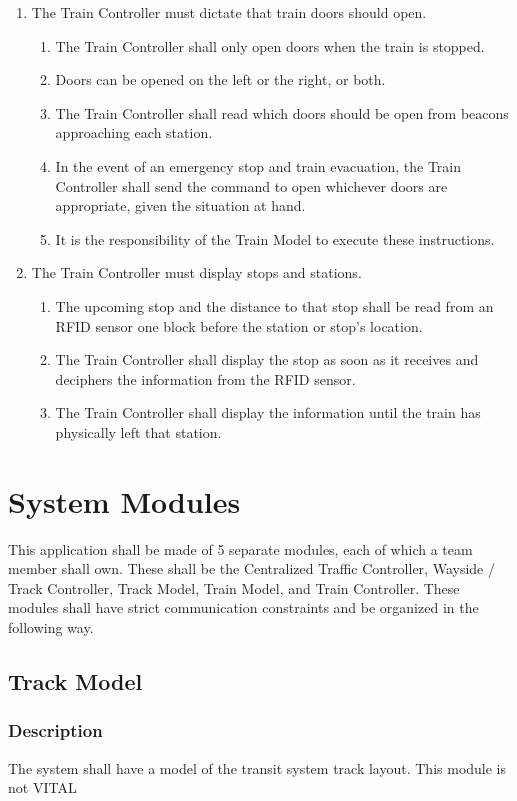 \documentclass{scrreprt}
\begin{document}
\begin{enumerate}
\item The Train Controller must dictate that train doors should open.
	\begin{enumerate}
		\item The Train Controller shall only open doors when the train is stopped.
		\item Doors can be opened on the left or the right, or both.
		\item The Train Controller shall read which doors should be open from beacons approaching each station.
		\item In the event of an emergency stop and train evacuation, the Train Controller shall send the command to open whichever doors are appropriate, given the situation at hand.
		\item It is the responsibility of the Train Model to execute these instructions.
	\end{enumerate}

\item The Train Controller must display stops and stations.
	\begin{enumerate}
		\item The upcoming stop and the distance to that stop shall be read from an RFID sensor one block before the station or stop's location.
		\item The Train Controller shall display the stop as soon as it receives and deciphers the information from the RFID sensor.
		\item The Train Controller shall display the information until the train has physically left that station.
	\end{enumerate}
\end{enumerate}

\chapter{System Modules}
This application shall be made of 5 separate modules, each of which a team member shall own.
These shall be the Centralized Traffic Controller, Wayside / Track Controller, Track Model, Train Model, and Train Controller.
These modules shall have strict communication constraints and be organized in the following way.

\section{Track Model}

\subsection{Description}
The system shall have a model of the transit system track layout. This module is not VITAL
\end{document}
